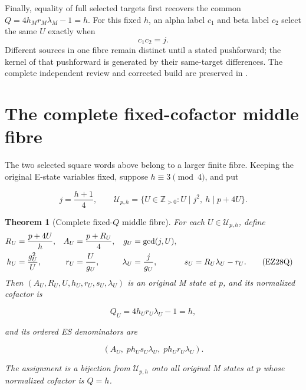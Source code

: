 \documentclass[11pt]{article}
\newtheorem{theorem}{Theorem}[section]
\theoremstyle{definition}\newtheorem{definition}[theorem]{Definition}
\theoremstyle{remark}\newtheorem{remark}[theorem]{Remark}
\begin{document}
Finally, equality of full selected targets first recovers the common
\(Q=4h_Mr_M\lambda_M-1=h\).  For this fixed \(h\), an alpha label \(c_1\)
and beta label \(c_2\) select the same \(U\) exactly when
\begin{equation}
 c_1c_2=j.                                              \tag{EZ28z}
\end{equation}
Different sources in one fibre remain distinct until a stated pushforward;
the kernel of that pushforward is generated by their same-target differences.
The complete independent review and corrected build are preserved in
\cite{Turn7Fabel}.

\section{The complete fixed-cofactor middle fibre}

The two selected square words above belong to a larger finite fibre.  Keeping
the original E-state variables fixed, suppose \(h\equiv3\pmod4\), and put

\begin{equation}
 j=\frac{h+1}{4},\qquad
 \mathcal U_{p,h}=\{U\in\mathbb Z_{>0}:U\mid j^2,\ h\mid p+4U\}.
                                                               \tag{EZ28P}
\end{equation}

\begin{theorem}[Complete fixed-\(Q\) middle fibre]
For each \(U\in\mathcal U_{p,h}\), define
\begin{align}
 R_U&=\frac{p+4U}{h},& A_U&=\frac{p+R_U}{4},&g_U&=\gcd(j,U),\notag\\
 h_U&=\frac{g_U^2}{U},&r_U&=\frac{U}{g_U},&
 \lambda_U&=\frac{j}{g_U},&s_U&=R_U\lambda_U-r_U.       \tag{EZ28Q}
\end{align}
Then \((A_U,R_U,U,h_U,r_U,s_U,\lambda_U)\) is an original M state
at \(p\), and its normalized cofactor is

\begin{equation}
 Q_U=4h_Ur_U\lambda_U-1=h,                              \tag{EZ28R}
\end{equation}

and its ordered ES denominators are

\begin{equation}
 \boxed{\left(A_U,\;p h_Us_U\lambda_U,\;
                    p h_Ur_U\lambda_U\right).}          \tag{EZ28S}
\end{equation}

The assignment is a bijection from \(\mathcal U_{p,h}\) onto all original M
states at \(p\) whose normalized cofactor is \(Q=h\).
\end{theorem}
\end{document}
